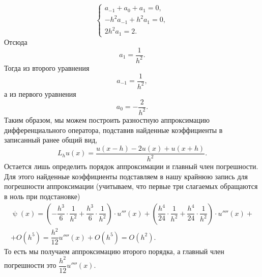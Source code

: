 \documentclass[a4paper, 12pt]{article}
\renewcommand{\psi}{\uppsi}
\begin{document}
\begin{enumerate}
$$\begin{cases}
			a_{-1} + a_0 + a_1= 0,\\
			-h^2 a_{-1}+ h^2 a_1= 0,\\
			2h^2a_1 = 2.
		\end{cases}$$
		Отсюда $$a_1 = \dfrac{1}{h^2}.$$
		Тогда из второго уравнения $$a_{-1} = \dfrac{1}{h^2},$$ а из первого уравнения $$a_0 = -\dfrac{2}{h^2}.$$
		Таким образом, мы можем построить разностную аппроксимацию дифференциального оператора, подставив найденные коэффициенты в записанный ранее общий вид,
		$$L_h u(x) = \dfrac{u(x-h)  -2 u(x) +  u(x+h)}{h^2}.$$ 
		Остается лишь определить порядок аппроксимации и главный член погрешности. Для этого найденные коэффициенты подставляем в нашу крайнюю запись для погрешности аппроксимации (учитываем, что первые три слагаемых обращаются в ноль при подстановке)
		\begin{multline*}
			\psi(x) = \left(-\dfrac{h^3}{6}\cdot \dfrac{1}{h^2} +\dfrac{h^3}{6} \cdot \dfrac{1}{h^2}\right)\cdot u'''(x) + \left(\dfrac{h^4}{24}\cdot \dfrac{1}{h^2} +\dfrac{h^4}{24} \cdot \dfrac{1}{h^2}\right)\cdot u''''(x)+\\ +O(h^5) = \dfrac{h^2}{12} u''''(x) + O(h^5) = O(h^2).
		\end{multline*}
		То есть мы получаем аппроксимацию второго порядка, а главный член погрешности это $\dfrac{h^2}{12} u''''(x)$.
	

\end{enumerate}
\end{document}
